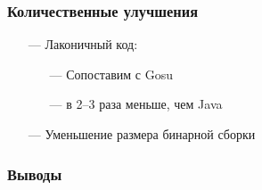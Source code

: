 \documentclass[14pt]{beamer}
\begin{document}
\begin{frame}\frametitle{Количественные улучшения}
    \begin{itemize}
        \item[---] Лаконичный код:
            \begin{itemize}
                \item[---] Сопоставим с Gosu
                \item[---] в 2--3 раза меньше, чем Java
            \end{itemize}
        \item[---] Уменьшение размера бинарной сборки
    \end{itemize}
\end{frame}

\begin{frame}\frametitle{Выводы}
\end{frame}
\end{document}

